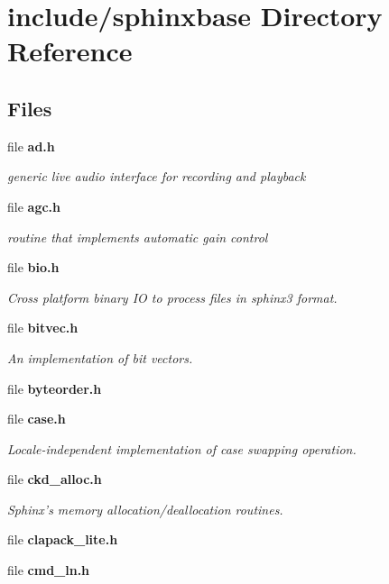 \section{include/sphinxbase Directory Reference}
\label{dir_e3d154c296a8e9be2797a4f81e9375b2}
\subsection*{Files}
\begin{DoxyCompactItemize}
\item 
file {\bf ad.\-h}
\begin{DoxyCompactList}\small\item\em generic live audio interface for recording and playback \end{DoxyCompactList}\item 
file {\bf agc.\-h}
\begin{DoxyCompactList}\small\item\em routine that implements automatic gain control \end{DoxyCompactList}\item 
file {\bf bio.\-h}
\begin{DoxyCompactList}\small\item\em Cross platform binary I\-O to process files in sphinx3 format. \end{DoxyCompactList}\item 
file {\bf bitvec.\-h}
\begin{DoxyCompactList}\small\item\em An implementation of bit vectors. \end{DoxyCompactList}\item 
file {\bfseries byteorder.\-h}
\item 
file {\bf case.\-h}
\begin{DoxyCompactList}\small\item\em Locale-\/independent implementation of case swapping operation. \end{DoxyCompactList}\item 
file {\bf ckd\-\_\-alloc.\-h}
\begin{DoxyCompactList}\small\item\em Sphinx's memory allocation/deallocation routines. \end{DoxyCompactList}\item 
file {\bfseries clapack\-\_\-lite.\-h}
\item 
file {\bf cmd\-\_\-ln.\-h}

\end{DoxyCompactItemize}
